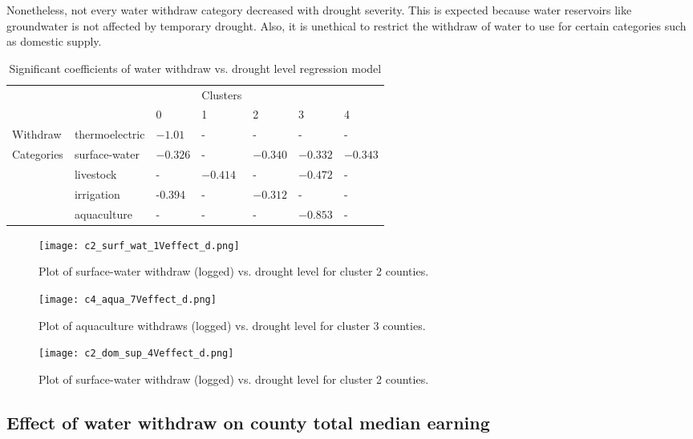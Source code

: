 \documentclass{article}
\begin{document}
Nonetheless, not every water withdraw category decreased with drought severity. This is expected because water reservoirs like groundwater is not affected by temporary drought. Also, it is unethical to restrict the withdraw of water to use for certain categories such as domestic supply. 

\begin{table}[htbp!]
  \caption{Significant coefficients of water withdraw vs. drought level regression model}
  \label{sample-table}
  \centering
  \begin{tabular}{l|l|lllll}
    \toprule
    
    &&&Clusters&&& \\
    \cmidrule(r){3-7}
           && 0     &1 & 2&3 & 4  \\
    \midrule
 Withdraw & thermoelectric    & $-1.01$ & - & - &  - & -\\
  Categories & surface-water   &$-0.326$  & - & $-0.340$ & $-0.332$ &$-0.343$\\
   & livestock &- & $-0.414$& - &$-0.472$& -\\
   & irrigation &-0.394&-&$-0.312$ &- & -\\
   & aquaculture &-&-&-&$-0.853$ & -\\
    \bottomrule
  \end{tabular}
\end{table}

\begin{figure}[htb!]
    \centering
    \texttt{[image: c2\_surf\_wat\_1Veffect\_d.png]}
    \caption{Plot of surface-water withdraw (logged) vs. drought level for cluster 2 counties.}
    \label{fig:my_label}
\end{figure}

\begin{figure}[htb!]
    \centering
    \texttt{[image: c4\_aqua\_7Veffect\_d.png]}
    \caption{Plot of aquaculture withdraws (logged) vs. drought level for cluster 3 counties.}
    \label{fig:my_label}
\end{figure}

\begin{figure}[t!]
    \centering
    \texttt{[image: c2\_dom\_sup\_4Veffect\_d.png]}
    \caption{Plot of surface-water withdraw (logged) vs. drought level for cluster 2 counties.}
    \label{fig:my_label}
\end{figure}

\clearpage

\subsection{Effect of water withdraw on county total median earning}
\end{document}
